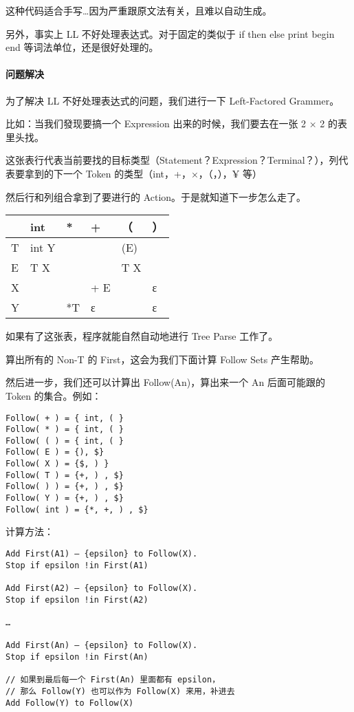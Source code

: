 \documentclass[
]{article}
\begin{document}
这种代码适合手写\ldots 因为严重跟原文法有关，且难以自动生成。

另外，事实上 LL 不好处理表达式。对于固定的类似于 if then else print
begin end 等词法单位，还是很好处理的。

\hypertarget{header-n65}{%
\paragraph{问题解决}\label{header-n65}}

为了解决 LL 不好处理表达式的问题，我们进行一下 Left-Factored Grammer。

比如：当我们發现要搞一个 Expression 出来的时候，我们要去在一张 2 × 2
的表里头找。

这张表行代表当前要找的目标类型（Statement？Expression？Terminal？），列代表要拿到的下一个
Token 的类型（int，+，×，（，），¥ 等）

然后行和列组合拿到了要进行的 Action。于是就知道下一步怎么走了。

\begin{longtable}[]{@{}llllll@{}}
\toprule
& int & * & + & （ & ）\tabularnewline
\midrule
\endhead
T & int Y & & & (E) &\tabularnewline
E & T X & & & T X &\tabularnewline
X & & & + E & & ε\tabularnewline
Y & & *T & ε & & ε\tabularnewline
\bottomrule
\end{longtable}

如果有了这张表，程序就能自然自动地进行 Tree Parse 工作了。

算出所有的 Non-T 的 First，这会为我们下面计算 Follow Sets 产生帮助。

然后进一步，我们还可以计算出 Follow(An)，算出来一个 An 后面可能跟的
Token 的集合。例如：

\begin{verbatim}
Follow( + ) = { int, ( } 
Follow( * ) = { int, ( } 
Follow( ( ) = { int, ( } 
Follow( E ) = {), $} 
Follow( X ) = {$, ) } 
Follow( T ) = {+, ) , $} 
Follow( ) ) = {+, ) , $} 
Follow( Y ) = {+, ) , $} 
Follow( int ) = {*, +, ) , $}
\end{verbatim}

计算方法：

\begin{verbatim}
Add First(A1) – {epsilon} to Follow(X). 
Stop if epsilon !in First(A1)   

Add First(A2) – {epsilon} to Follow(X). 
Stop if epsilon !in First(A2)  

…  

Add First(An) – {epsilon} to Follow(X). 
Stop if epsilon !in First(An)  

// 如果到最后每一个 First(An) 里面都有 epsilon，
// 那么 Follow(Y) 也可以作为 Follow(X) 来用，补进去
Add Follow(Y) to Follow(X)
\end{verbatim}
\end{document}

